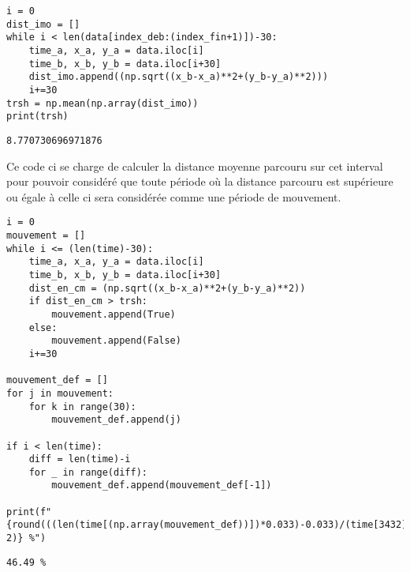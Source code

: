\documentclass[11pt]{article}
\begin{document}
\begin{verbatim}
i = 0
dist_imo = []
while i < len(data[index_deb:(index_fin+1)])-30:
    time_a, x_a, y_a = data.iloc[i]
    time_b, x_b, y_b = data.iloc[i+30]
    dist_imo.append((np.sqrt((x_b-x_a)**2+(y_b-y_a)**2)))
    i+=30
trsh = np.mean(np.array(dist_imo))
print(trsh)
\end{verbatim}

\label{orgbb8836a}
\begin{verbatim}
8.770730696971876
\end{verbatim}


Ce code ci se charge de calculer la distance moyenne parcouru sur cet interval pour pouvoir considéré que toute période où la distance parcouru est
supérieure ou égale à celle ci sera considérée comme une période de mouvement.

\begin{verbatim}
i = 0
mouvement = []
while i <= (len(time)-30):
    time_a, x_a, y_a = data.iloc[i]
    time_b, x_b, y_b = data.iloc[i+30]
    dist_en_cm = (np.sqrt((x_b-x_a)**2+(y_b-y_a)**2))
    if dist_en_cm > trsh:
        mouvement.append(True)
    else:
        mouvement.append(False)
    i+=30

mouvement_def = []
for j in mouvement:
    for k in range(30):
        mouvement_def.append(j)

if i < len(time):
    diff = len(time)-i
    for _ in range(diff):
        mouvement_def.append(mouvement_def[-1])

print(f"{round(((len(time[(np.array(mouvement_def))])*0.033)-0.033)/(time[3432])*100, 2)} %")
\end{verbatim}

\label{org7ae3063}
\begin{verbatim}
46.49 %
\end{verbatim}
\end{document}
